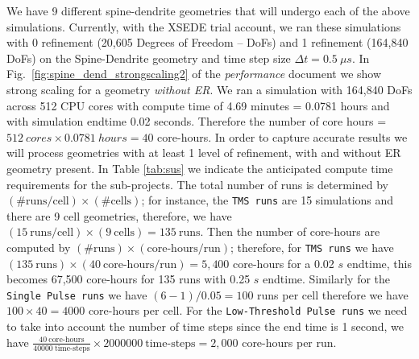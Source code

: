 We have 9 different spine-dendrite geometries that will undergo each of the above simulations. Currently, with the XSEDE trial account, we ran these simulations with 0 refinement (20,605 Degrees of Freedom -- DoFs) and 1 refinement (164,840 DoFs) on the Spine-Dendrite geometry and time step size $\Delta t =0.5\ \mu s$. In Fig.~\ref{fig:spine_dend_strongscaling2} of the \textit{performance} document we show strong scaling for a geometry \textit{without ER}. {We ran a simulation with 164,840 DoFs across 512 CPU cores with compute time of 4.69 minutes = 0.0781 hours and with simulation endtime 0.02 seconds. Therefore the number of core hours = $512\ cores \times 0.0781\ hours =  40$ core-hours. In order to capture accurate results we will process geometries with at least 1 level of refinement, with and without ER geometry present. In Table \ref{tab:sus} we indicate the anticipated compute time requirements for the sub-projects. The total number of runs is determined by $(\#\text{runs} / \text{cell})\times(\#\text{cells})$; for instance, {the \texttt{TMS runs} are 15 simulations and there are 9 cell geometries, therefore, we have $(15\ \text{runs} / \text{cell})\times(9\ \text{cells}) = 135\ \text{runs}$. 
Then the number of core-hours are computed by $(\#\text{runs})\times(\text{core-hours}/ \text{run})$; therefore, for \texttt{TMS runs} we have $(135 \ \text{runs})\times(40\ \text{core-hours}/\text{run}) = 5,400$ core-hours for a 0.02 $s$ endtime, this becomes 67,500 core-hours for 135 runs with 0.25 $s$ endtime.} Similarly for the \texttt{Single Pulse runs} we have {$(6-1)/0.05=100$ runs per cell therefore we have $100\times 40 = 4000$} core-hours per cell. For the \texttt{Low-Threshold Pulse runs} we need to take into account the number of time steps since the end time is 1 second, we have $\frac{40\ \text{core-hours}}{40000\ \text{time-steps}}\times 2000000\ \text{time-steps} = 2,000 $ core-hours per run.}
